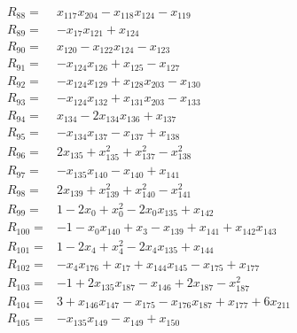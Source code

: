 \documentclass[11pt]{article}
\theoremstyle{remark}\newtheorem{remark}[theorem]{Remark}
\begin{document}
\begin{align*}
R_{88} ={}& x_{117}x_{204} - x_{118}x_{124} - x_{119} \\[4pt]
R_{89} ={}& -x_{17}x_{121} + x_{124} \\[4pt]
R_{90} ={}& x_{120} - x_{122}x_{124} - x_{123} \\[4pt]
R_{91} ={}& -x_{124}x_{126} + x_{125} - x_{127} \\[4pt]
R_{92} ={}& -x_{124}x_{129} + x_{128}x_{203} - x_{130} \\[4pt]
R_{93} ={}& -x_{124}x_{132} + x_{131}x_{203} - x_{133} \\[4pt]
R_{94} ={}& x_{134} - 2x_{134}x_{136} + x_{137} \\[4pt]
R_{95} ={}& -x_{134}x_{137} - x_{137} + x_{138} \\[4pt]
R_{96} ={}& 2x_{135} + x_{135}^{2} + x_{137}^{2} - x_{138}^{2} \\[4pt]
R_{97} ={}& -x_{135}x_{140} - x_{140} + x_{141} \\[4pt]
R_{98} ={}& 2x_{139} + x_{139}^{2} + x_{140}^{2} - x_{141}^{2} \\[4pt]
R_{99} ={}& 1 - 2x_{0} + x_{0}^{2} - 2x_{0}x_{135} + x_{142} \\[4pt]
R_{100} ={}& -1 - x_{0}x_{140} + x_{3} - x_{139} + x_{141} + x_{142}x_{143} \\[4pt]
R_{101} ={}& 1 - 2x_{4} + x_{4}^{2} - 2x_{4}x_{135} + x_{144} \\[4pt]
R_{102} ={}& -x_{4}x_{176} + x_{17} + x_{144}x_{145} - x_{175} + x_{177} \\[4pt]
R_{103} ={}& -1 + 2x_{135}x_{187} - x_{146} + 2x_{187} - x_{187}^{2} \\[4pt]
R_{104} ={}& 3 + x_{146}x_{147} - x_{175} - x_{176}x_{187} + x_{177} + 6x_{211} \\[4pt]
R_{105} ={}& -x_{135}x_{149} - x_{149} + x_{150} \\[4pt]

\end{align*}
\end{document}
